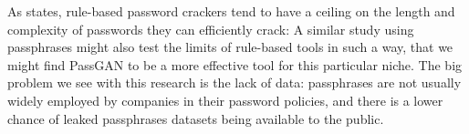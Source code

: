 As \cite{Melicher2016} states, rule-based password crackers tend to have a ceiling on the length and complexity of passwords they can efficiently crack: A similar study using passphrases might also test the limits of rule-based tools in such a way, that we might find PassGAN to be a more effective tool for this particular niche. The big problem we see with this research is the lack of data: passphrases are not usually widely employed by companies in their password policies, and there is a lower chance of leaked passphrases datasets being available to the public.  
